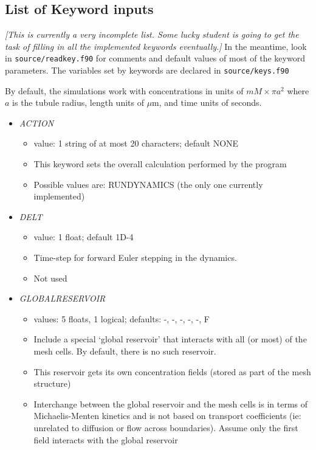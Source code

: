 \documentclass[12pt]{article}
\newcommand{\comment}[1]{{\color{red} \it [#1]}}
\begin{document}
\subsection*{List of Keyword inputs}

\comment{This is currently a very incomplete list. Some lucky student is going to get the task of filling in all the implemented keywords eventually.} In the meantime, look in \verb=source/readkey.f90= for comments and default values of most of the keyword parameters. The variables set by keywords are declared in \verb=source/keys.f90=

By default, the simulations work with concentrations in units of $mM \times \pi a^2$ where $a$ is the tubule radius, length units of $\mu$m, and time units of seconds.

\begin{itemize}
%
\item {\it ACTION}
  \begin{itemize}
    \item  value: 1 string of at most 20 characters; default NONE
    \item This keyword sets the overall calculation performed by the program 
    \item Possible values are: RUNDYNAMICS (the only one currently implemented)
  \end{itemize}
%
\item {\it DELT}
    \begin{itemize}
      \item  value: 1 float; default 1D-4
      \item Time-step for forward Euler stepping in the dynamics. 
      \item Not used
    \end{itemize}
%
\item {\it GLOBALRESERVOIR}
\begin{itemize}
	\item values: 5 floats, 1 logical; defaults: -, -, -, -, -, F
	\item Include a special `global reservoir' that interacts with all (or most) of the mesh cells. By default, there is no such reservoir.
	\item This reservoir gets its own concentration fields (stored as part of the mesh structure)
	\item Interchange between the global reservoir and the mesh cells is in terms of Michaelis-Menten kinetics and is not based on transport coefficients (ie: unrelated to diffusion or flow across boundaries). Assume only the first field interacts with the global reservoir

\end{itemize}
\end{itemize}
\end{document}
